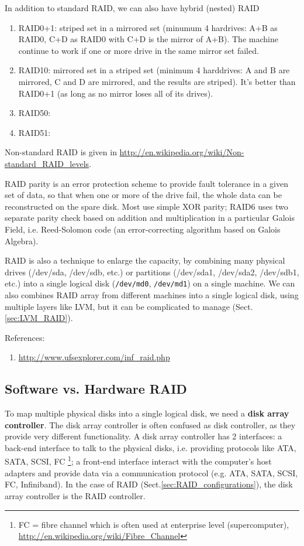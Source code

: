 In addition to standard RAID, we can also have hybrid (nested) RAID
\begin{enumerate}
  \item RAID0+1: striped set in a mirrored set (minumum 4 hardrives: A+B as
  RAID0, C+D as RAID0 with C+D is the mirror of A+B).
  The machine continue to work if one or more drive in the same mirror set failed.
  
  \item RAID10: mirrored set in a striped set (minimum 4 harddrives: A and B
  are mirrored, C and D are mirrored, and the results are striped).
  It's better than RAID0+1 (as long as no mirror loses all of its drives).
  
  \item RAID50:
  \item RAID51:
\end{enumerate}
Non-standard RAID is given in
\url{http://en.wikipedia.org/wiki/Non-standard_RAID_levels}. 

\begin{framed}
RAID parity is an error protection scheme to provide fault tolerance in a given
set of data, so that when one or more of the drive fail, the whole data can be
reconstructed on the spare disk. Most use simple XOR parity; RAID6 uses two
separate parity check based on addition and multiplication in a particular
Galois Field, i.e. Reed-Solomon code (an error-correcting algorithm based on
Galois Algebra).
\end{framed}

RAID is also a technique to enlarge the capacity, by combining many physical
drives (/dev/sda, /dev/sdb, etc.) or partitions (/dev/sda1, /dev/sda2,
/dev/sdb1, etc.) into a single logical disk (\verb!/dev/md0!, \verb!/dev/md1!)
on a single machine. We can also combines RAID array from different machines
into a single logical disk, using multiple layers like LVM, but it can be
complicated to manage (Sect.\ref{sec:LVM_RAID}). 

References:
\begin{enumerate}
  \item \url{http://www.ufsexplorer.com/inf_raid.php}
\end{enumerate}

\subsection{Software vs. Hardware RAID}
\label{sec:RAID_software-hardware}

To map multiple physical disks into a single logical disk, we need a {\bf disk array controller}. The
disk array controller is often confused as disk controller, as they provide very
different functionality. A disk array controller has 2 interfaces: a back-end
interface to talk to the physical disks, i.e. providing protocols like ATA,
SATA, SCSI, FC \footnote{FC = fibre channel which is often used at enterprise
level (supercomputer), \url{http://en.wikipedia.org/wiki/Fibre_Channel}}; a
front-end interface interact with the computer's host adapters and provide data
via a communication protocol (e.g. ATA, SATA, SCSI, FC, Infiniband). In the case
of RAID (Sect.\ref{sec:RAID_configurations}), the disk array controller is the
RAID controller.


